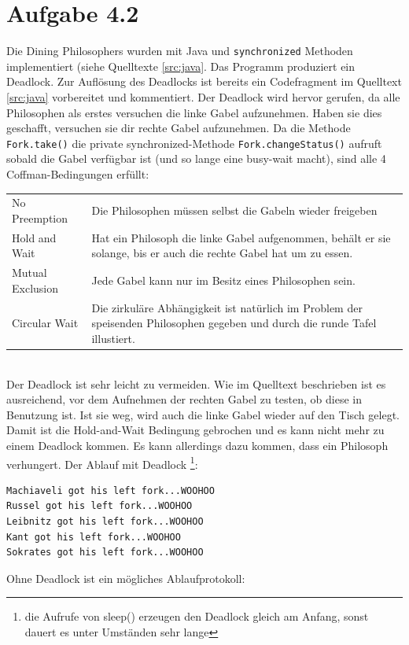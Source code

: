 \documentclass[a4paper,
12pt,
BCOR12mm,
]{scrartcl}
\begin{document}
\section*{Aufgabe 4.2}
Die Dining Philosophers wurden mit Java und \verb|synchronized| Methoden
implementiert (siehe Quelltexte \ref{src:java}. Das Programm produziert ein
Deadlock. Zur Auflösung des Deadlocks ist bereits ein Codefragment im Quelltext
\ref{src:java} vorbereitet und kommentiert. 
Der Deadlock wird hervor gerufen, da alle Philosophen als erstes versuchen die
linke Gabel aufzunehmen. Haben sie dies geschafft, versuchen sie dir rechte
Gabel aufzunehmen. Da die Methode \verb|Fork.take()| die private
synchronized-Methode \verb|Fork.changeStatus()| aufruft sobald die Gabel
verfügbar ist (und so lange eine busy-wait macht), sind alle 4
Coffman-Bedingungen erfüllt:\\
\begin{tabular}{lp{11cm}}
  No Preemption     & Die Philosophen müssen selbst die Gabeln wieder freigeben \\
  Hold and Wait     & Hat ein Philosoph die linke Gabel aufgenommen, behält er sie solange, bis er auch die rechte Gabel hat um zu essen. \\
  Mutual Exclusion  & Jede Gabel kann nur im Besitz eines Philosophen sein. \\
  Circular Wait     & Die zirkuläre Abhängigkeit ist natürlich im Problem der speisenden Philosophen gegeben und durch die runde Tafel illustiert.
\end{tabular} \\
Der Deadlock ist sehr leicht zu vermeiden. Wie im Quelltext beschrieben ist es
ausreichend, vor dem Aufnehmen der rechten Gabel zu testen, ob diese in
Benutzung ist. Ist sie weg, wird auch die linke Gabel wieder auf den Tisch
gelegt. Damit ist die Hold-and-Wait Bedingung gebrochen und es kann nicht mehr
zu einem Deadlock kommen. Es kann allerdings dazu kommen, dass ein Philosoph
verhungert.
Der Ablauf mit Deadlock \footnote{die Aufrufe von sleep() erzeugen den Deadlock
gleich am Anfang, sonst dauert es unter Umständen sehr lange}:
\begin{verbatim}
Machiaveli got his left fork...WOOHOO
Russel got his left fork...WOOHOO
Leibnitz got his left fork...WOOHOO
Kant got his left fork...WOOHOO
Sokrates got his left fork...WOOHOO
\end{verbatim}
Ohne Deadlock ist ein mögliches Ablaufprotokoll:
\end{document}
